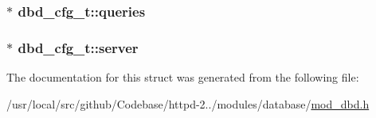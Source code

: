 \subsubsection[{\texorpdfstring{queries}{queries}}]{$\ast$ dbd\+\_\+cfg\+\_\+t\+::queries}\hypertarget{structdbd__cfg__t_a8058057d3bf0c7690a45333ebb60e238}{}\label{structdbd__cfg__t_a8058057d3bf0c7690a45333ebb60e238}
\subsubsection[{\texorpdfstring{server}{server}}]{$\ast$ dbd\+\_\+cfg\+\_\+t\+::server}\hypertarget{structdbd__cfg__t_a91d108e66ffcd225c9bcca560780736e}{}\label{structdbd__cfg__t_a91d108e66ffcd225c9bcca560780736e}


The documentation for this struct was generated from the following file\+:\begin{DoxyCompactItemize}
\item 
/usr/local/src/github/\+Codebase/httpd-\/2../modules/database/\hyperlink{mod__dbd_8h}{mod\+\_\+dbd.\+h}\end{DoxyCompactItemize}
